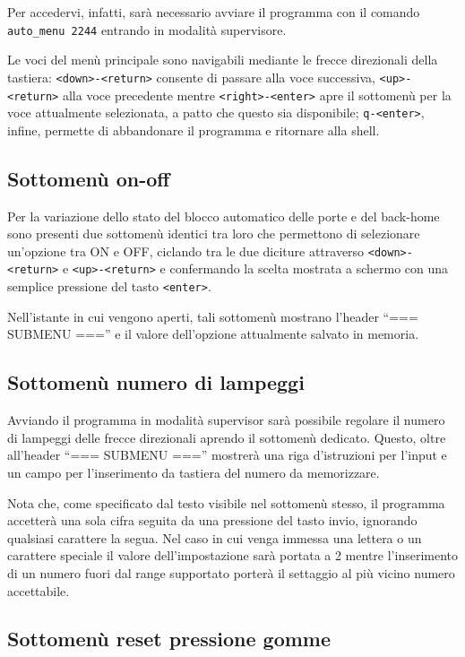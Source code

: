 \documentclass[
  12pt,
  a4paper,
  headings=optiontoheadandtoc
]{scrreprt}
\begin{document}
Per accedervi, infatti, sarà necessario avviare il programma con il comando \texttt{auto\_menu 2244} entrando in modalità supervisore.

Le voci del menù principale sono navigabili mediante le frecce direzionali della tastiera: \texttt{<down>-<return>} consente di passare alla voce successiva, \texttt{<up>-<return>} alla voce precedente mentre \texttt{<right>-<enter>} apre il sottomenù per la voce attualmente selezionata, a patto che questo sia disponibile; \texttt{q-<enter>}, infine, permette di abbandonare il programma e ritornare alla shell.

\subsection[nonumber=true]{Sottomenù on-off}

Per la variazione dello stato del blocco automatico delle porte e del back-home sono presenti due sottomenù identici tra loro che permettono di selezionare un'opzione tra ON e OFF, ciclando tra le due diciture attraverso \texttt{<down>-<return>} e \texttt{<up>-<return>} e confermando la scelta mostrata a schermo con una semplice pressione del tasto \texttt{<enter>}.

Nell'istante in cui vengono aperti, tali sottomenù mostrano l'header ``=== SUBMENU ==='' e il valore dell'opzione attualmente salvato in memoria.

\subsection[nonumber=true]{Sottomenù numero di lampeggi}

Avviando il programma in modalità supervisor sarà possibile regolare il numero di lampeggi delle frecce direzionali aprendo il sottomenù dedicato. Questo, oltre all'header ``=== SUBMENU ==='' mostrerà una riga d'istruzioni per l'input e un campo per l'inserimento da tastiera del numero da memorizzare.

Nota che, come specificato dal testo visibile nel sottomenù stesso, il programma accetterà una sola cifra seguita da una pressione del tasto invio, ignorando qualsiasi carattere la segua. Nel caso in cui venga immessa una lettera o un carattere speciale il valore dell'impostazione sarà portata a 2 mentre l'inserimento di un numero fuori dal range supportato porterà il settaggio al più vicino numero accettabile.

\subsection[nonumber=true]{Sottomenù reset pressione gomme}
\end{document}
